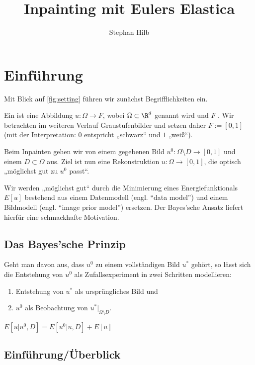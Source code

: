 \documentclass{mythesis}
\title{Inpainting mit Eulers Elastica}
\author{Stephan Hilb}
\begin{document}


\chapter{Einführung}


Mit Blick auf \ref{fig:setting} führen wir zunächst Begrifflichkeiten ein.


\begin{definition} \label{def:image}
    Ein  ist eine Abbildung $u: \Omega \to F$, wobei $\Omega \subset \R^d$
     genannt wird und $F$ .
    Wir betrachten im weiteren Verlauf Graustufenbilder und setzen daher $F := [0,1]$ (mit der
    Interpretation: $0$ entspricht „schwarz“ und $1$ „weiß“).
\end{definition}

Beim Inpainten gehen wir von einem gegebenen Bild $u^0: \Omega \setminus D \to [0,1]$ und einem 
$D \subset \Omega$ aus. Ziel ist nun eine Rekonstruktion $u: \Omega \to [0,1]$, die optisch „möglichst gut zu $u^0$ passt“.

Wir werden „möglichst gut“ durch die Minimierung eines Energiefunktionals $E[u]$ bestehend aus einem Datenmodell (engl. “data model”) und einem Bildmodell (engl. “image prior model”) ersetzen.
Der Bayes'sche Ansatz liefert hierfür eine schmackhafte Motivation.

\section{Das Bayes'sche Prinzip}

Geht man davon aus, dass $u^0$ zu einem vollständigen Bild $u^*$ gehört, so lässt sich die Entstehung von $u^0$ als Zufallsexperiment in zwei Schritten modellieren:
\begin{enumerate}
    \item
	Entstehung von $u^*$ als ursprüngliches Bild und
    \item
        $u^0$ als Beobachtung von $u^*|_{\Omega \setminus D}$.
\end{enumerate}




\begin{math}
    E[u|u^0, D] = E[u^0|u,D] + E[u]
\end{math}







\section{Einführung/Überblick}
\end{document}
